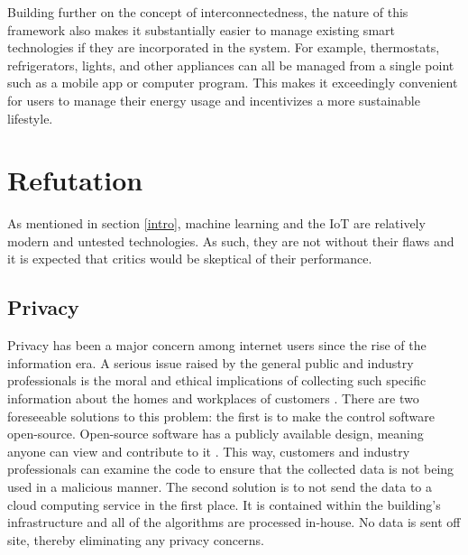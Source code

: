 \documentclass[letterpaper]{article}
\begin{document}
Building further on the concept of interconnectedness, the nature of this framework also makes it substantially easier to manage existing smart technologies if they are incorporated in the system. For example, thermostats, refrigerators, lights, and other appliances can all be managed from a single point such as a mobile app or computer program. This makes it exceedingly convenient for users to manage their energy usage and incentivizes a more sustainable lifestyle.

\section{Refutation} \label{refute}
As mentioned in section \ref{intro}, machine learning and the IoT are relatively modern and untested technologies. As such, they are not without their flaws and it is expected that critics would be skeptical of their performance.\par

\subsection{Privacy}
Privacy has been a major concern among internet users since the rise of the information era. A serious issue raised by the general public and industry professionals is the moral and ethical implications of collecting such specific information about the homes and workplaces of customers \cite{perisic16, mccalman17}. There are two foreseeable solutions to this problem: the first is to make the control software open-source. Open-source software has a publicly available design, meaning anyone can view and contribute to it \cite{opensource}. This way, customers and industry professionals can examine the code to ensure that the collected data is not being used in a malicious manner. The second solution is to not send the data to a cloud computing service in the first place. It is contained within the building's infrastructure and all of the algorithms are processed in-house. No data is sent off site, thereby eliminating any privacy concerns.\par
\end{document}
